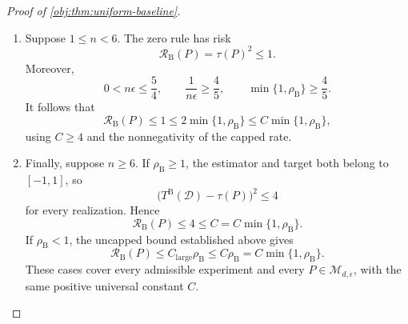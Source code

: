 \documentclass[11pt]{article}
\begin{document}
\begin{proof}[Proof of \cref{obj:thm:uniform-baseline}]
\begin{enumerate}
\item
Suppose \(1\le n<6\). The zero rule has risk
\[
\mathcal R_{\mathrm B}(P)=\tau(P)^2\le1.
\]
Moreover,
\[
0<n\epsilon\le\frac54,
\qquad
\frac{1}{n\epsilon}\ge\frac45,
\qquad
\min\{1,\rho_{\mathrm B}\}\ge\frac45.
\]
It follows that
\[
\mathcal R_{\mathrm B}(P)
\le1
\le2\min\{1,\rho_{\mathrm B}\}
\le C\min\{1,\rho_{\mathrm B}\},
\]
using \(C\ge4\) and the nonnegativity of the capped rate.

\item
Finally, suppose \(n\ge6\). If \(\rho_{\mathrm B}\ge1\), the estimator and target both belong to \([-1,1]\), so
\[
\bigl(T^{\mathrm B}(\mathcal D)-\tau(P)\bigr)^2\le4
\]
for every realization. Hence
\[
\mathcal R_{\mathrm B}(P)
\le4
\le C
=
C\min\{1,\rho_{\mathrm B}\}.
\]
If \(\rho_{\mathrm B}<1\), the uncapped bound established above gives
\[
\mathcal R_{\mathrm B}(P)
\le C_{\mathrm{large}}\rho_{\mathrm B}
\le C\rho_{\mathrm B}
=
C\min\{1,\rho_{\mathrm B}\}.
\]
These cases cover every admissible experiment and every
\(P\in\mathcal M_{d,\epsilon}\), with the same positive universal constant \(C\).
\end{enumerate}
\end{proof}
\end{document}

